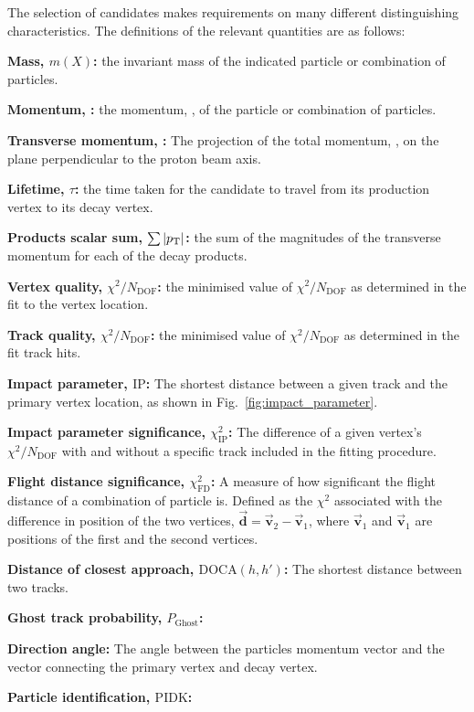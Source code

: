 The selection of candidates makes requirements on many different distinguishing characteristics. The definitions of the relevant quantities are as follows:  
\begin{description}
\item \textbf{Mass, $m(X)$:} the invariant mass of the indicated particle or combination of particles. 
\item \textbf{Momentum, \ptot:} the momentum, \ptot, of the particle or combination of particles.
\item \textbf{Transverse momentum, \pt:} The projection of the total momentum, \ptot, on the plane perpendicular to the proton beam axis.
\item \textbf{Lifetime, $\tau$:} the time taken for the candidate to travel from its production vertex to its decay vertex.
\item \textbf{Products \pt scalar sum, $\sum{|\pt|}$:} the sum of the magnitudes of the transverse momentum for each of the decay products.
\item \textbf{Vertex quality, $\chi^{2}/N_{\text{DOF}}$:} the minimised value of $\chi^{2}/N_{\text{DOF}}$ as determined in the fit to the vertex location.
\item \textbf{Track quality, $\chi^{2}/N_{\text{DOF}}$:} the minimised value of $\chi^{2}/N_{\text{DOF}}$ as determined in the fit track hits.
\item \textbf{Impact parameter, $\text{IP}$:} The shortest distance between a given track and the primary vertex location, as shown in Fig.~\ref{fig:impact_parameter}. 
\item \textbf{Impact parameter significance, $\chi^{2}_{\text{IP}}$:} The difference of a given vertex's $\chi^{2}/N_{\text{DOF}}$ with and without a specific track included in the fitting procedure.
\item \textbf{Flight distance significance, $\chi^{2}_{\text{FD}}$:} A measure of how significant the flight distance of a combination of particle is. Defined as the $\chi^{2}$ associated with the difference in position of the two vertices, $\vec{\mathbf{d}} = \vec{\mathbf{v}}_2 - \vec{\mathbf{v}}_1$, where $\vec{\mathbf{v}}_1$ and $\vec{\mathbf{v}}_1$ are positions of the first and the second vertices. 


\item \textbf{Distance of closest approach, $\text{DOCA}(h,h')$:} The shortest distance between two tracks.
\item \textbf{Ghost track probability, $P_{\text{Ghost}}$:} 
\item \textbf{Direction angle:} The angle between the particles momentum vector and the vector connecting the primary vertex and decay vertex.

\item \textbf{Particle identification, $\text{PIDK}$:}  
\end{description}

